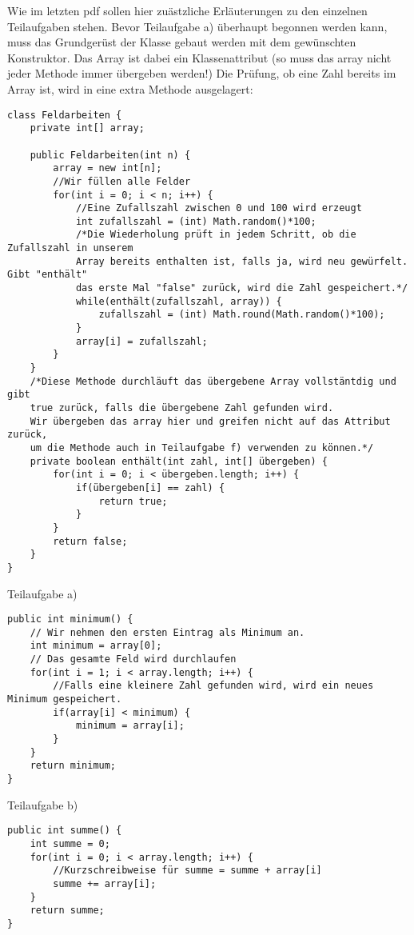 \documentclass{article}
\begin{document}
\thispagestyle{firstpage}
\setlength{\headsep}{12pt}
Wie im letzten pdf sollen hier zuästzliche Erläuterungen zu den einzelnen Teilaufgaben stehen. Bevor Teilaufgabe a) überhaupt begonnen werden kann, muss das Grundgerüst der Klasse gebaut werden mit dem gewünschten Konstruktor. Das Array ist dabei ein Klassenattribut (so muss das array nicht jeder Methode immer übergeben werden!) Die Prüfung, ob eine Zahl bereits im Array ist, wird in eine extra Methode ausgelagert:
\begin{verbatim}
class Feldarbeiten {
    private int[] array;

    public Feldarbeiten(int n) {
        array = new int[n];
        //Wir füllen alle Felder
        for(int i = 0; i < n; i++) {
            //Eine Zufallszahl zwischen 0 und 100 wird erzeugt
            int zufallszahl = (int) Math.random()*100;
            /*Die Wiederholung prüft in jedem Schritt, ob die Zufallszahl in unserem
            Array bereits enthalten ist, falls ja, wird neu gewürfelt. Gibt "enthält"
            das erste Mal "false" zurück, wird die Zahl gespeichert.*/
            while(enthält(zufallszahl, array)) {
                zufallszahl = (int) Math.round(Math.random()*100);
            }
            array[i] = zufallszahl;
        }
    }
    /*Diese Methode durchläuft das übergebene Array vollstäntdig und gibt 
    true zurück, falls die übergebene Zahl gefunden wird.
    Wir übergeben das array hier und greifen nicht auf das Attribut zurück,
    um die Methode auch in Teilaufgabe f) verwenden zu können.*/
    private boolean enthält(int zahl, int[] übergeben) {
        for(int i = 0; i < übergeben.length; i++) {
            if(übergeben[i] == zahl) {
                return true;
            }
        }
        return false;
    }
}
\end{verbatim}
Teilaufgabe a)
\begin{verbatim}
public int minimum() {
    // Wir nehmen den ersten Eintrag als Minimum an.
    int minimum = array[0];
    // Das gesamte Feld wird durchlaufen
    for(int i = 1; i < array.length; i++) {
        //Falls eine kleinere Zahl gefunden wird, wird ein neues Minimum gespeichert.
        if(array[i] < minimum) {
            minimum = array[i];
        }
    }
    return minimum;
}
\end{verbatim}
Teilaufgabe b)
\begin{verbatim}
public int summe() {
    int summe = 0;
    for(int i = 0; i < array.length; i++) {
        //Kurzschreibweise für summe = summe + array[i]
        summe += array[i];
    }
    return summe;
}
\end{verbatim}
\end{document}
